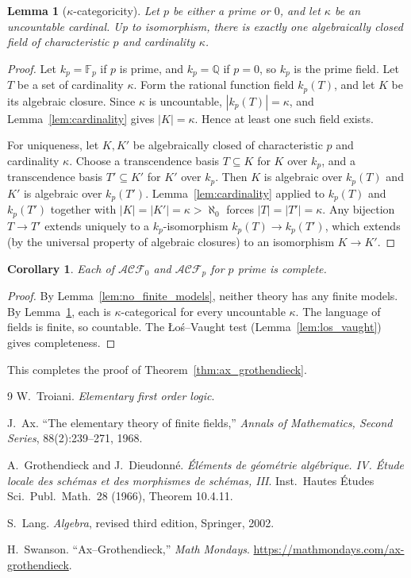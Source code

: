 \documentclass[12pt]{article}
\theoremstyle{plain}
\newtheorem{lemma}[thm]{Lemma}
\newtheorem{cor}[thm]{Corollary}
\theoremstyle{definition}
\newcommand{\bb}[1]{\mathbb{#1}}
\newcommand{\call}[1]{\mathcal{#1}}
\begin{document}
\begin{lemma}[$\kappa$-categoricity]\label{lem:kappa_categorical}
Let $p$ be either a prime or $0$, and let $\kappa$ be an uncountable cardinal. Up to isomorphism, there is exactly one algebraically closed field of characteristic $p$ and cardinality $\kappa$.
\end{lemma}
\begin{proof}
Let $k_p = \bb{F}_p$ if $p$ is prime, and $k_p = \bb{Q}$ if $p = 0$, so $k_p$ is the prime field. Let $T$ be a set of cardinality $\kappa$. Form the rational function field $k_p(T)$, and let $K$ be its algebraic closure. Since $\kappa$ is uncountable, $|k_p(T)| = \kappa$, and Lemma~\ref{lem:cardinality} gives $|K| = \kappa$. Hence at least one such field exists.

For uniqueness, let $K, K'$ be algebraically closed of characteristic $p$ and cardinality $\kappa$. Choose a transcendence basis $T \subseteq K$ for $K$ over $k_p$, and a transcendence basis $T' \subseteq K'$ for $K'$ over $k_p$. Then $K$ is algebraic over $k_p(T)$ and $K'$ is algebraic over $k_p(T')$. Lemma~\ref{lem:cardinality} applied to $k_p(T)$ and $k_p(T')$ together with $|K|=|K'|=\kappa>\aleph_0$ forces $|T| = |T'| = \kappa$. Any bijection $T \to T'$ extends uniquely to a $k_p$-isomorphism $k_p(T) \to k_p(T')$, which extends (by the universal property of algebraic closures) to an isomorphism $K \to K'$.
\end{proof}

\begin{cor}\label{cor:completeness}
Each of $\call{ACF}_0$ and $\call{ACF}_p$ for $p$ prime is complete.
\end{cor}
\begin{proof}
By Lemma~\ref{lem:no_finite_models}, neither theory has any finite models. By Lemma~\ref{lem:kappa_categorical}, each is $\kappa$-categorical for every uncountable $\kappa$. The language of fields is finite, so countable. The {\L}o\'s--Vaught test (Lemma~\ref{lem:los_vaught}) gives completeness.
\end{proof}

This completes the proof of Theorem~\ref{thm:ax_grothendieck}.

\begin{thebibliography}{9}
W.\ Troiani.
\emph{Elementary first order logic}.

J.\ Ax.
``The elementary theory of finite fields,''
\emph{Annals of Mathematics, Second Series}, 88(2):239--271, 1968.

A.\ Grothendieck and J.\ Dieudonn\'e.
\emph{\'El\'ements de g\'eom\'etrie alg\'ebrique. IV. \'Etude locale des sch\'emas et des morphismes de sch\'emas, III}.
Inst.\ Hautes \'Etudes Sci.\ Publ.\ Math.\ 28 (1966), Theorem 10.4.11.

S.\ Lang.
\emph{Algebra}, revised third edition, Springer, 2002.

H.\ Swanson.
``Ax--Grothendieck,''
\emph{Math Mondays}.
\url{https://mathmondays.com/ax-grothendieck}.
\end{thebibliography}
\end{document}
